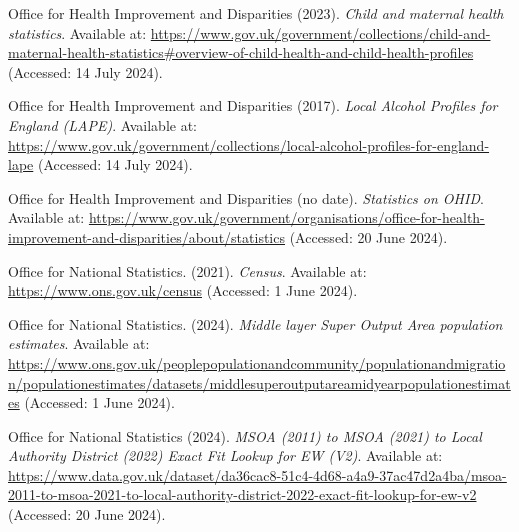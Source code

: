 \begin{Reference}
\begin{flushleft}
Office for Health Improvement and Disparities (2023). \textit{Child and maternal health statistics}. Available at: \url{https://www.gov.uk/government/collections/child-and-maternal-health-statistics#overview-of-child-health-and-child-health-profiles} (Accessed: 14 July 2024).
\end{flushleft}
\vspace{2pt}


\begin{flushleft}
Office for Health Improvement and Disparities (2017). \textit{Local Alcohol Profiles for England (LAPE)}. Available at: \url{https://www.gov.uk/government/collections/local-alcohol-profiles-for-england-lape} (Accessed: 14 July 2024).
\end{flushleft}
\vspace{2pt}


\begin{flushleft}
Office for Health Improvement and Disparities (no date). \textit{Statistics on OHID}. Available at: \url{https://www.gov.uk/government/organisations/office-for-health-improvement-and-disparities/about/statistics} (Accessed: 20 June 2024).
\end{flushleft}
\vspace{2pt}


\begin{flushleft}
Office for National Statistics. (2021). \textit{Census}. Available at: \url{https://www.ons.gov.uk/census} (Accessed: 1 June 2024).
\end{flushleft}
\vspace{7pt}


\begin{flushleft}
Office for National Statistics. (2024). \textit{Middle layer Super Output Area population estimates}. Available at: \url{https://www.ons.gov.uk/peoplepopulationandcommunity/populationandmigration/populationestimates/datasets/middlesuperoutputareamidyearpopulationestimates} (Accessed: 1 June 2024).
\end{flushleft}
\vspace{7pt}


\begin{flushleft}
Office for National Statistics (2024). \textit{MSOA (2011) to MSOA (2021) to Local Authority District (2022) Exact Fit Lookup for EW (V2)}. Available at: \url{https://www.data.gov.uk/dataset/da36cac8-51c4-4d68-a4a9-37ac47d2a4ba/msoa-2011-to-msoa-2021-to-local-authority-district-2022-exact-fit-lookup-for-ew-v2} (Accessed: 20 June 2024).
\end{flushleft}
\vspace{2pt}



\end{Reference}
